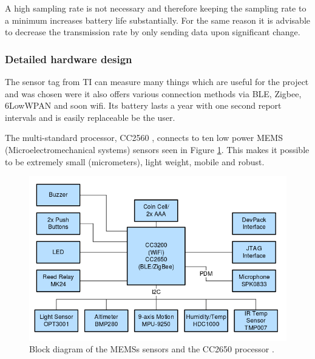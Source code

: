 A high sampling rate is not necessary and therefore keeping the sampling rate to a minimum increases battery life substantially. For the same reason it is advisable to decrease the transmission rate by only sending data upon significant change.

\subsubsection{Detailed hardware design}

The sensor tag from TI can measure many things which are useful for the project and was chosen were it also offers various connection methods via BLE, Zigbee, 6LowWPAN and soon wifi. Its battery lasts a year with one second report intervals and is easily replaceable be the user. 

The multi-standard processor, CC2560 \cite{block-cc2650}, connects to ten low power MEMS (Microelectromechanical systems) \cite{MEMS} sensors seen in Figure \ref{fig:sensors}. This makes it possible to be extremely small (micrometers), light weight, mobile and robust.

\begin{figure}[!h]
	\includegraphics[width=\linewidth]{sensors-layout}
	\caption{Block diagram of the MEMSs sensors and the CC2650 processor \cite{block-cc2650}.}
	\label{fig:sensors}
\end{figure}


